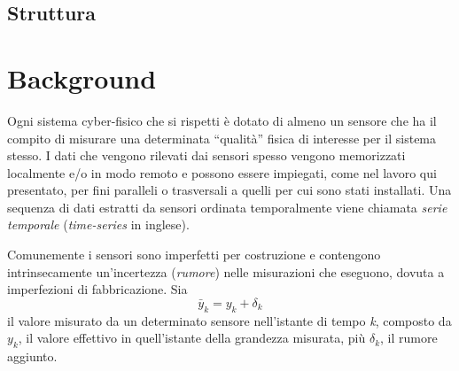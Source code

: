 \documentclass[Lau,binding=0.6cm]{sapthesis}
\begin{document}
\section{Struttura}



\chapter{Background}\label{chap:1}

Ogni sistema cyber-fisico che si rispetti è dotato di almeno un sensore che ha il compito di misurare una determinata ``qualità'' fisica di interesse per il sistema stesso. 
I dati che vengono rilevati dai sensori spesso vengono memorizzati localmente e/o in modo remoto e possono essere impiegati,
come nel lavoro qui presentato, per fini paralleli o trasversali a quelli per cui sono stati installati.
Una sequenza di dati estratti da sensori ordinata temporalmente viene chiamata \textit{serie temporale} (\textit{time-series} in inglese).

Comunemente i sensori sono imperfetti per costruzione e contengono intrinsecamente un'incertezza (\textit{rumore}) nelle misurazioni che eseguono, dovuta a imperfezioni di fabbricazione.
Sia 
\begin{equation}
\bar{y}_{k} = y_{k} + \delta_{k}\label{eq:1}
\end{equation}
il valore misurato da un determinato sensore nell'istante di tempo \textit{k}, composto da $y_k$, il valore effettivo in quell'istante della grandezza misurata, più $\delta_k$, il rumore aggiunto.
\end{document}
